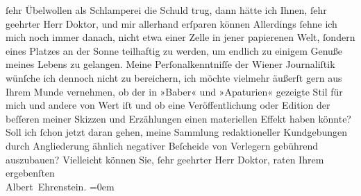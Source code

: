 \begin{ledgroupsized}[t]{13cm}
                    ſehr Übelwollen als Schlamperei die Schuld trug, dann hätte ich Ihnen, ſehr
                    geehrter Herr Doktor, und mir allerhand erſparen können{\dotsfour} Allerdings ſehne ich mich noch immer danach, nicht etwa einer Zelle
                    in jener papierenen Welt, ſondern eines Platzes an der Sonne teilhaftig zu
                    werden, um endlich zu einigem Genuße meines Lebens zu gelangen. Meine
                    Perſonalkenntniſſe der Wiener Journaliſtik
                    wünſche ich dennoch nicht zu bereichern, ich möchte vielmehr äußerſt gern aus
                    Ihrem Munde vernehmen, ob der in »Baber« und
                        »Apaturien« gezeigte Stil für mich und
                    andere von Wert iſt und ob eine Veröffentlichung oder Edition der beſſeren
                    meiner Skizzen und Erzählungen einen materiellen Effekt haben könnte? Soll ich
                    ſchon jetzt daran gehen, meine Sammlung redaktioneller Kundgebungen durch
                    Angliederung ähnlich negativer Beſcheide von Verlegern gebührend auszubauen?
                    Vielleicht können Sie, ſehr geehrter Herr Doktor, raten\pend
           \pstart
           Ihrem ergebenſten{\\[\baselineskip]}\spacefill\mbox{Albert Ehrenstein.}\pend
           \leftskip=0em{}          \endnumbering{}\end{ledgroupsized}  \newcommand{\dateiname}{L01880}\newcommand{\titel}{Albert Ehrenstein an Arthur Schnitzler, 17. 10. 1909}\newcommand{\editorInnen}{Martin Anton Müller und Gerd-Hermann Susen}
      